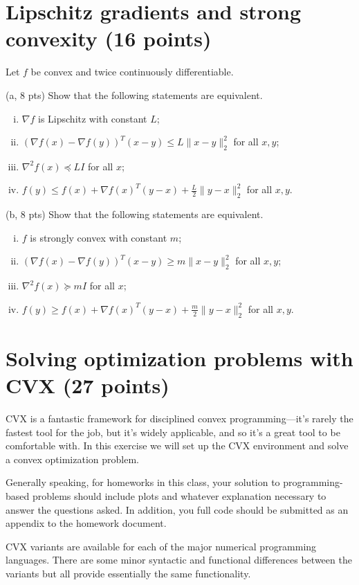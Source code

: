 \documentclass{article}
\theoremstyle{remark}
\theoremstyle{definition}
\begin{document}
\section{Lipschitz gradients and strong convexity (16 points)}

Let $f$ be convex and twice continuously differentiable.

\bigskip
\noindent
(a, 8 pts) Show that the following statements are equivalent.
\begin{enumerate}[i.]
\item $\nabla f$ is Lipschitz with constant $L$;
\item $(\nabla f(x) - \nabla f(y))^T(x-y) \leq L \|x-y\|_2^2$ for all
  $x,y$; 
\item $\nabla^2 f(x) \preceq LI$ for all $x$;
\item $f(y) \leq f(x) + \nabla f(x)^T (y-x) + \frac{L}{2} \|y-x\|_2^2$
  for all $x,y$.
\end{enumerate}

\bigskip
\noindent
(b, 8 pts) Show that the following statements are equivalent.
\begin{enumerate}[i.]
\item $f$ is strongly convex with constant $m$;
\item $(\nabla f(x) - \nabla f(y))^T(x-y) \geq m \|x-y\|_2^2$ for all
  $x,y$;
\item $\nabla^2 f(x) \succeq mI$ for all $x$;
\item $f(y) \geq f(x) + \nabla f(x)^T (y-x) + \frac{m}{2}
  \|y-x\|_2^2$ for all $x,y$.
\end{enumerate}

\section{Solving optimization problems with CVX (27 points)}

CVX is a fantastic framework for disciplined convex programming---it's rarely
the fastest tool for the job, but it's widely applicable, and so it's a great
tool to be comfortable with. In this exercise we will set up the CVX
environment and solve a convex optimization problem.

Generally speaking, for homeworks in this class, your solution to
programming-based problems should include plots and whatever explanation
necessary to answer the questions asked. In addition, you full code should be  
submitted as an appendix to the homework document.

CVX variants are available for each of the major numerical programming
languages. There are some minor syntactic and functional differences between the
variants but all provide essentially the same functionality. 
\end{document}
